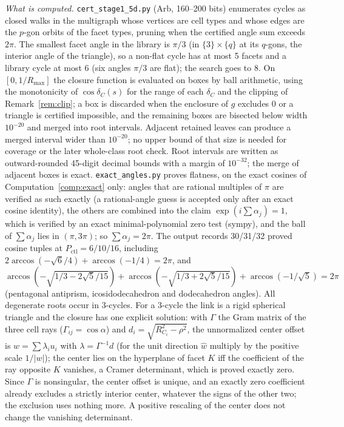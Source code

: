 \documentclass[11pt]{article}
\theoremstyle{definition}
\theoremstyle{remark}
\begin{document}
\noindent\emph{What is computed.} \texttt{cert\_stage1\_5d.py} (Arb,
160--200 bits) enumerates cycles as closed walks in the multigraph whose
vertices are cell types and whose edges are the $p$-gon orbits of the
facet types, pruning when the certified angle sum exceeds $2\pi$. The
smallest facet angle in the library is $\pi/3$ (in $\{3\}\times\{q\}$ at
its $q$-gons, the interior angle of the triangle), so a non-flat cycle has
at most 5 facets and a library cycle at most 6 (six angles $\pi/3$ are
flat); the search goes to 8.
On $[0,1/R_{\max}]$ the closure function is evaluated on boxes by ball
arithmetic, using the monotonicity of $\cos\delta_C(s)$ for the range of
each $\delta_C$ and the clipping of Remark~\ref{rem:clip}; a box is
discarded when the enclosure of $g$ excludes $0$ or a triangle is
certified impossible, and the remaining boxes are bisected below width
$10^{-20}$ and merged into root intervals. Adjacent retained leaves can
produce a merged interval wider than $10^{-20}$; no upper bound of that
size is needed for coverage or the later whole-class root check.
Root intervals are written as
outward-rounded 45-digit decimal bounds with a margin of $10^{-32}$; the
merge of adjacent boxes is exact.
\texttt{exact\_angles.py} proves flatness, on the exact cosines of
Computation~\ref{comp:exact} only: angles that are rational
multiples of $\pi$ are verified as such exactly (a rational-angle guess is
accepted only after an exact cosine identity), the others are combined
into the claim $\exp(i\sum\alpha_j)=1$, which is verified by an exact
minimal-polynomial zero test (sympy), and the ball of $\sum\alpha_j$
lies in $(\pi,3\pi)$; so $\sum\alpha_j=2\pi$. The output records 30/31/32 proved cosine tuples at
$P_{\mathrm{ctl}}=6/10/16$, including
$2\arccos(-\sqrt6/4)+\arccos(-1/4)=2\pi$, and
$\arccos(-\sqrt{1/3-2\sqrt5/15})+\arccos(-\sqrt{1/3+2\sqrt5/15})+\arccos(-1/\sqrt5)=2\pi$
(pentagonal antiprism, icosidodecahedron and dodecahedron angles). All
degenerate roots occur in 3-cycles. For a 3-cycle the link is a rigid
spherical triangle and the closure has one explicit solution: with $\Gamma$
the Gram matrix of the three cell rays ($\Gamma_{ij}=\cos\alpha$) and
$d_i=\sqrt{R_{C_i}^2-\rho^2}$, the unnormalized center offset is
$w=\sum\lambda_iu_i$ with $\lambda=\Gamma^{-1}d$ (for the unit direction
$\hat w$ multiply by the positive scale $1/|w|$); the center lies on the
hyperplane of facet $K$ iff the coefficient of the ray opposite $K$
vanishes, a Cramer determinant, which is proved exactly zero. Since $\Gamma$
is nonsingular, the center offset is unique, and an exactly zero
coefficient already excludes a strictly interior center, whatever the signs
of the other two; the exclusion uses nothing more. A positive
rescaling of the center does not change the vanishing determinant.
\end{document}
